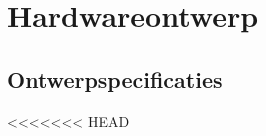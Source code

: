 \documentclass[a4paper,twoside,kulak]{kulakreport} %
\begin{document}
\section{Hardwareontwerp} \label{Hardwareontwerp}

\subsection{Ontwerpspecificaties} \label{Ontwerpspecificaties}

<<<<<<< HEAD
\end{document}
